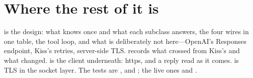 \section{Where the rest of it is}

 is the design: what  knows once and what each
subclass answers, the four wires in one table, the tool loop, and what is
deliberately not here---OpenAI's Responses endpoint, Kiss's retries,
server-side TLS.  records what crossed from
Kiss's  and what changed.  is
the client underneath: https, and a reply read as it comes.
 is TLS in the socket layer. The tests are
,  and ;
the live ones  and .
